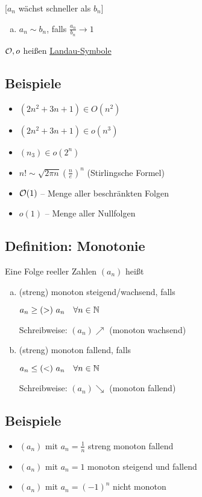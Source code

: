 \documentclass[10pt,a4paper]{article}
\begin{document}
    [$a_n$ wächst schneller als $b_n$]

    \begin{enumerate}[a), resume]
        \item $a_n \sim b_n$, falls $\frac{a_n}{b_n} \to 1$
    \end{enumerate}

    $\mathcal{O}, o$ heißen \underline{Landau-Symbole}

    \subsection{Beispiele}
    \begin{itemize}
        \item $(2n^2 + 3n + 1) \in O(n^2)$
        \item $(2n^2 + 3n + 1) \in o(n^3)$
        \item $(n_3) \in o(2^n)$
        \item $n! \sim \sqrt{2 \pi n} \left(\frac{n}{e}\right)^n$ (Stirlingsche Formel)
        \item $\mathcal{O}(1)$ -- Menge aller beschränkten Folgen
        \item $o(1)$ -- Menge aller Nullfolgen
    \end{itemize}

    \subsection{Definition: Monotonie}

    Eine Folge reeller Zahlen $(a_n)$ heißt
    \begin{enumerate}[a)]
        \item (streng) monoton steigend/wachsend, falls

        $a_n \geq(>) \ a_n \quad \forall n \in \mathbb{N}$
        
        Schreibweise: $(a_n) \nearrow$ (monoton wachsend)
        \item (streng) monoton fallend, falls

        $a_n \leq(<) \ a_n \quad \forall n \in \mathbb{N}$
        
        Schreibweise: $(a_n) \searrow$ (monoton fallend)
    \end{enumerate}

    \subsection{Beispiele}
    \begin{itemize}
        \item $(a_n)$ mit $a_n = \frac{1}{n}$ streng monoton fallend
        \item $(a_n)$ mit $a_n = 1$ monoton steigend und fallend
        \item $(a_n)$ mit $a_n = (-1)^n$ nicht monoton
    \end{itemize}
\end{document}
